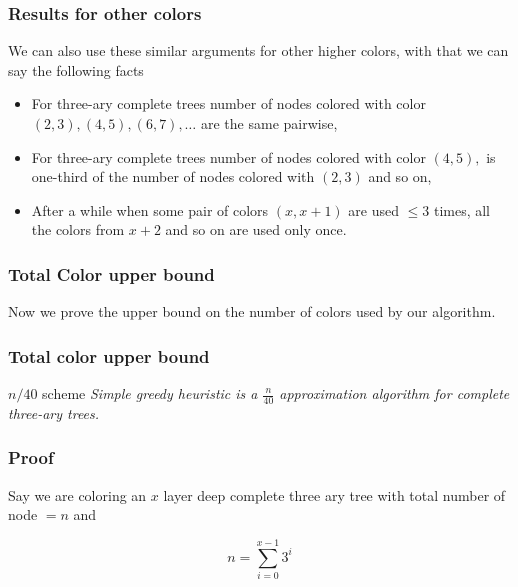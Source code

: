 \begin{frame}
    \frametitle{Results for other colors}

    We can also use these similar arguments for other higher colors, with that we can say the following facts\pause[]
    
    \begin{itemize}
        \item For three-ary complete trees number of nodes colored with color $(2, 3), (4, 5), (6, 7), \dots$ are the same pairwise,\pause[]
        \item For three-ary complete trees number of nodes colored with color $(4, 5),$ is one-third of the number of nodes colored with $(2, 3)$ and so on,\pause[]
        \item After a while when some pair of colors $(x, x + 1)$ are used $\leq 3$ times, all the colors from $x + 2$ and so on are used only once.
    \end{itemize}

\end{frame}

\begin{frame}
    \frametitle{Total Color upper bound}

    Now we prove the upper bound on the number of colors used by our algorithm.    

\end{frame}

\begin{frame}
    \frametitle{Total color upper bound}

    \begin{theo}{$n/40$ scheme}{}
        \textit{Simple greedy heuristic is a $\frac{n}{40}$ approximation algorithm for complete three-ary trees.}
    \end{theo}

\end{frame}

\begin{frame}
    \frametitle{Proof}

    Say we are coloring an $x$ layer deep complete three ary tree with total number of node $= n$ and 
    
    \[n = \displaystyle\sum_{i = 0} ^{x - 1} 3^i\]

\end{frame}


